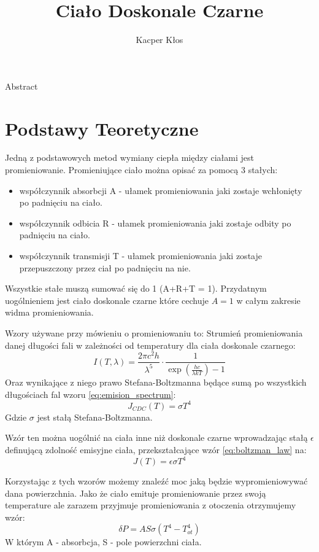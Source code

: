 \documentclass[12pt]{article}
\title{Ciało Doskonale Czarne}
\author{Kacper Kłos}
\begin{document}
\maketitle

Abstract

\newpage
\section{Podstawy Teoretyczne}
Jedną z podstawowych metod wymiany ciepła między ciałami jest promieniowanie.
Promieniujące ciało można opisać za pomocą 3 stałych:
\begin{itemize}
    \item współczynnik absorbcji A - ułamek promieniowania jaki zostaje wchłonięty po padnięciu na ciało.
    \item współczynnik odbicia R - ułamek promieniowania jaki zostaje odbity po padnięciu na ciało.
    \item współczynnik transmisji T - ułamek promieniowania jaki zostaje przepuszczony przez ciał po padnięciu na nie.
\end{itemize}
Wszystkie stałe muszą sumować się do 1 (A+R+T = 1).
Przydatnym uogólnieniem jest ciało doskonale czarne które cechuje $A=1$ w całym zakresie widma promieniowania.

Wzory używane przy mówieniu o promieniowaniu to:
Strumień promieniowania danej długości fali w zależności od temperatury dla ciała doskonale czarnego:
\begin{equation}
    I(T, \lambda) = \frac{2\pi c^2 h}{\lambda^5} \cdot \frac{1}{\exp(\frac{hc}{\lambda k T}) -1}
    \label{eq:emision_spectrum}
\end{equation}
Oraz wynikające z niego prawo Stefana-Boltzmanna będące sumą po wszystkich długościach fal wzoru \ref{eq:emision_spectrum}:
\begin{equation}
    J_{CDC}(T) = \sigma T^4
    \label{eq:boltzman_law}
\end{equation}
Gdzie $\sigma$ jest stałą Stefana-Boltzmanna.

Wzór ten można uogólnić na ciała inne niż doskonale czarne wprowadzając stałą $\epsilon$ definującą zdolność emisyjne ciała, przekształcające wzór \ref{eq:boltzman_law} na:
\begin{equation}
    J(T) = \epsilon \sigma T^4
    \label{eq:boltzman_law_epsilon}
\end{equation}

Korzystając z tych wzorów możemy znaleźć moc jaką będzie wypromieniowywać dana powierzchnia. Jako że ciało emituje promieniowanie przez swoją temperature ale zarazem przyjmuje promieniowania z otoczenia otrzymujemy wzór:
\begin{equation}
    \delta P = AS \sigma (T^4-T^4_{ot})
    \label{eq:power_loss}
\end{equation}
W którym A - absorbcja, S - pole powierzchni ciała. 
\end{document}
